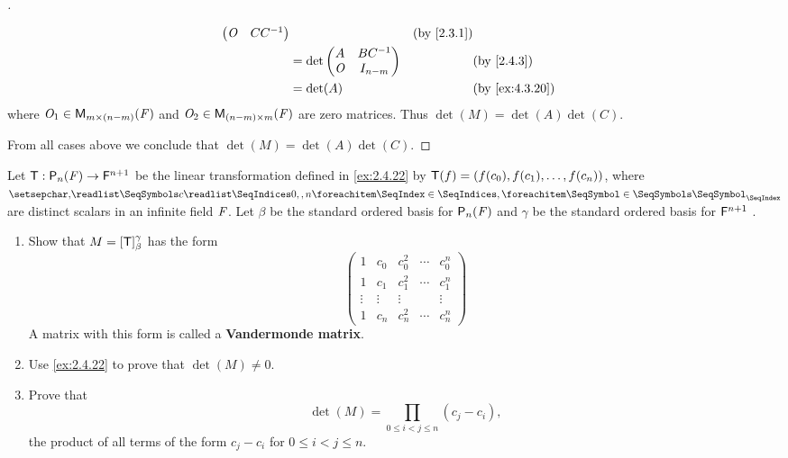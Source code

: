 \begin{proof}[]
\begin{itemize}
\begin{align*}
\begin{pmatrix}
                                                \zm & CC^{-1}
                                              \end{pmatrix}         &  & \text{(by \cref{2.3.1})}       \\
                                      & = \det\begin{pmatrix}
                                                A   & BC^{-1}   \\
                                                \zm & I_{n - m}
                                              \end{pmatrix}         &  & \text{(by \cref{2.4.3})}       \\
                                      & = \det(A)                     &  & \text{(by \cref{ex:4.3.20})}
          \end{align*}
          where \(\mathit{O}_1 \in \mathsf{M}_{{m} \times (n - m)}({\mathit{F}})\) and \(\mathit{O}_2 \in \mathsf{M}_{{(n - m)} \times m}({\mathit{F}})\) are zero matrices.
          Thus \(\det(M) = \det(A) \det(C)\).
  \end{itemize}
  From all cases above we conclude that \(\det(M) = \det(A) \det(C)\).
\end{proof}

\begin{ex}\label{ex:4.3.22}
  Let \(\T : \ps[n]{\F} \to \vs{F}^{n + 1}\) be the linear transformation defined in \cref{ex:2.4.22} by \(\mathsf{T}(f) = (f(c_0), f(c_1), \dots, f(c_n))\), where \(\seq{c}{0,,n}\) are distinct scalars in an infinite field \(\mathit{F}\).
  Let \(\beta\) be the standard ordered basis for \(\ps[n]{\F}\) and \(\gamma\) be the standard ordered basis for \(\mathsf{F}^{n + 1}\) .
  \begin{enumerate}
    \item Show that \(M = [\mathsf{T}]_{\beta}^{\gamma}\) has the form
          \[
            \begin{pmatrix}
              1      & c_0    & c_0^2  & \cdots & c_0^n  \\
              1      & c_1    & c_1^2  & \cdots & c_1^n  \\
              \vdots & \vdots & \vdots &        & \vdots \\
              1      & c_n    & c_n^2  & \cdots & c_n^n
            \end{pmatrix}
          \]
          A matrix with this form is called a \textbf{Vandermonde matrix}.
    \item Use \cref{ex:2.4.22} to prove that \(\det(M) \neq 0\).
    \item Prove that
          \[
            \det(M) = \prod_{0 \leq i < j \leq n} (c_j - c_i),
          \]
          the product of all terms of the form \(c_j - c_i\) for \(0 \leq i < j \leq n\).
  \end{enumerate}
\end{ex}

